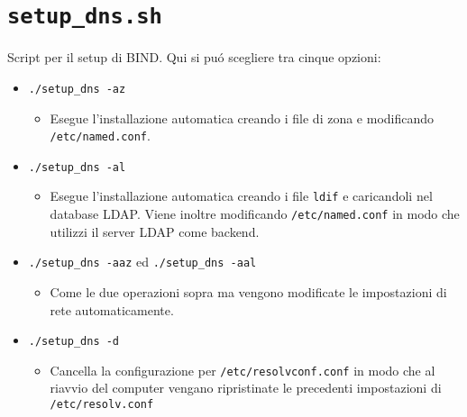 \documentclass[9pt, a4paper, oneside]{article}
\begin{document}
		\section{\texttt{setup\_dns.sh}}
			\par
				Script per il setup di BIND. Qui si pu\'o 
				scegliere tra cinque opzioni:
				\begin{itemize}
					\item
						\texttt{./setup\_dns -az}
						\begin{itemize}
							\item
								Esegue 
								l'installazione 
								automatica 
								creando i file 
								di zona e 
								modificando 
								\texttt{/etc/named.conf}.
						\end{itemize}
					\item
						\texttt{./setup\_dns -al}
						\begin{itemize}
							\item
								Esegue 
								l'installazione 
								automatica 
								creando i file 
								\texttt{ldif} 
								e caricandoli 
								nel database 
								LDAP.
								Viene inoltre 
								modificando 
								\texttt{/etc/named.conf}
								in modo che 
								utilizzi il 
								server LDAP 
								come backend.
						\end{itemize}
					\item
						\texttt{./setup\_dns -aaz} ed 
						\texttt{./setup\_dns -aal}
						\begin{itemize}
							\item
								Come le due 
								operazioni 
								sopra ma 
								vengono 
								modificate le 
								impostazioni di 
								rete 
								automaticamente.
						\end{itemize}
					\item
						\texttt{./setup\_dns -d}
						\begin{itemize}
							\item
								Cancella la 
								configurazione 
								per 
								\texttt{/etc/resolvconf.conf}
								in modo che al 
								riavvio del 
								computer 
								vengano 
								ripristinate 
								le precedenti 
								impostazioni di 
								\texttt{/etc/resolv.conf}
						\end{itemize}
				\end{itemize}
			\texttt{}
			\newpage
\end{document}
